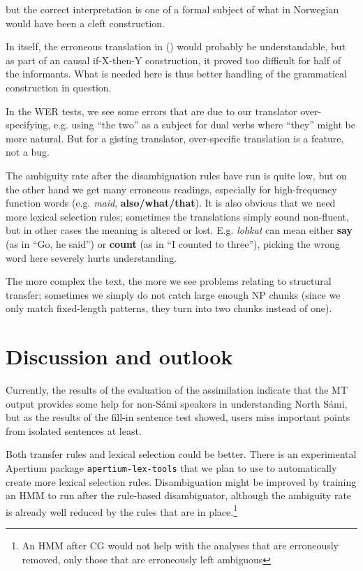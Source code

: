 \documentclass{book}
\begin{document}
but the correct interpretation is one of a formal subject of
what in Norwegian would have been a cleft construction.

In itself, the erroneous translation in () would probably be
understandable, but as part of an causal if-X-then-Y construction, it
proved too difficult for half of the informants. What is needed here
is thus better handling of the grammatical construction in question.

In the WER tests, we see some errors that are due to our translator
over-specifying, e.g. using ``the two'' as a subject for dual verbs
where ``they'' might be more natural. But for a gisting translator,
over-specific translation is a feature, not a bug.

The ambiguity rate after the disambiguation rules have run is quite
low, but on the other hand we get many erroneous readings, especially
for high-frequency function words (e.g. \textit{maid},
\textbf{also/what/that}). It is also obvious that we need more lexical
selection rules; sometimes the translations simply sound non-fluent,
but in other cases the meaning is altered or lost. E.g.
\textit{lohkat} can mean either \textbf{say} (as in ``Go, he said'')
or \textbf{count} (as in ``I counted to three''), picking the wrong
word here severely hurts understanding.

The more complex the text, the more we see problems relating to
structural transfer; sometimes we simply do not catch large enough NP
chunks (since we only match fixed-length patterns, they turn into two
chunks instead of one).


\section{Discussion and outlook}
Currently, the results of the evaluation of the assimilation indicate
that the MT output provides some help for non-S\'{a}mi speakers in
understanding North S\'{a}mi, but as the results of the fill-in sentence
test showed, users miss important points from isolated sentences at
least.

Both transfer rules and lexical selection could be better. There is an
experimental Apertium package \texttt{apertium-lex-tools} that we plan
to use to automatically create more lexical selection rules.
Disambiguation might be improved by training an HMM to run after the
rule-based disambiguator, although the ambiguity rate is already well
reduced by the rules that are in place.\footnote{An HMM after CG would
  not help with the analyses that are erroneously removed, only those
  that are erroneously left ambiguous}
\end{document}
